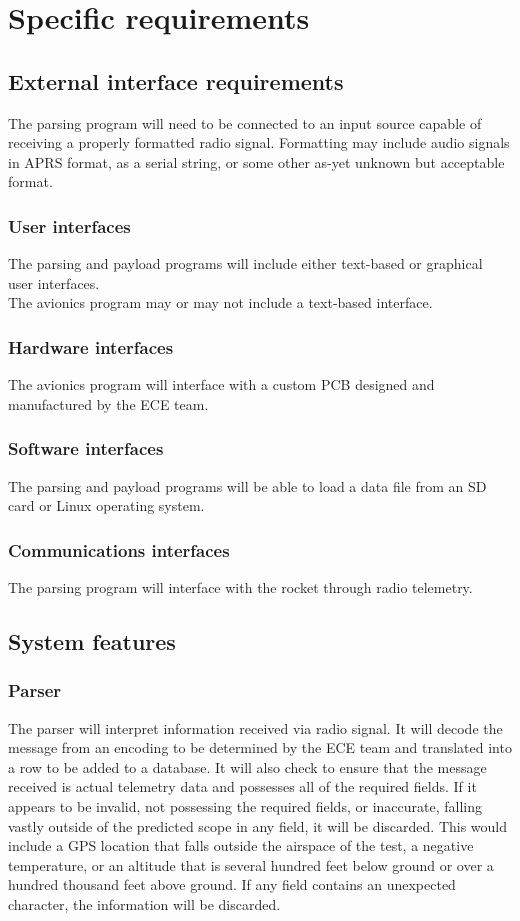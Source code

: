 \documentclass[onecolumn, draftclsnofoot, 10pt, compsoc]{IEEEtran}
\begin{document}
\section{Specific requirements}
\subsection{External interface requirements}
The parsing program will need to be connected to an input source capable of receiving a properly formatted radio signal.  Formatting may include audio signals in APRS format, as a serial string, or some other as-yet unknown but acceptable format.

\subsubsection{User interfaces}
The parsing and payload programs will include either text-based or graphical user interfaces.\\
The avionics program may or may not include a text-based interface.

\subsubsection{Hardware interfaces}
The avionics program will interface with a custom PCB designed and manufactured by the ECE team.
	
\subsubsection{Software interfaces}
The parsing and payload programs will be able to load a data file from an SD card or Linux operating system.

\subsubsection{Communications interfaces}
The parsing program will interface with the rocket through radio telemetry.

\subsection{System features}

\subsubsection{Parser}
The parser will interpret information received via radio signal. It will decode the message from an encoding to be determined by the ECE team and translated into a row to be added to a database. It will also check to ensure that the message received is actual telemetry data and possesses all of the required fields. If it appears to be invalid, not possessing the required fields, or inaccurate, falling vastly outside of the predicted scope in any field, it will be discarded. This would include a GPS location that falls outside the airspace of the test, a negative temperature, or an altitude that is several hundred feet below ground or over a hundred thousand feet above ground. If any field contains an unexpected character, the information will be discarded.
\end{document}
